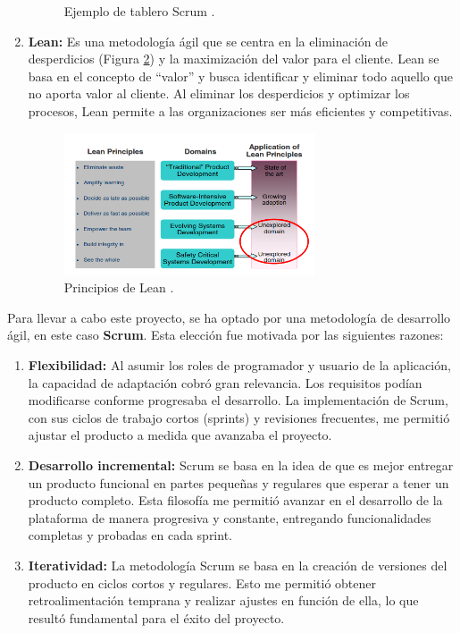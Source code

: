 \begin{enumerate}
\begin{figure}[H]
        \caption{Ejemplo de tablero Scrum \cite{karabiyik2020understanding}.}
        \label{fig:scrum}
    \end{figure}
    \item \textbf{Lean:} Es una metodología ágil que se centra en la eliminación de desperdicios (Figura \ref{fig:lean}) y la maximización del valor para el cliente. Lean se basa en el concepto de ``valor'' y busca identificar y eliminar todo aquello que no aporta valor al cliente. Al eliminar los desperdicios y optimizar los procesos, Lean permite a las organizaciones ser más eficientes y competitivas.
    \begin{figure}[H]
        \centering
        \includegraphics[width=0.7\textwidth]{imagenes/lean.png}
        \caption{Principios de Lean \cite{cawley2010lean}.}
        \label{fig:lean}
    \end{figure}
\end{enumerate}

Para llevar a cabo este proyecto, se ha optado por una metodología de desarrollo ágil, en este caso \textbf{Scrum}. Esta elección fue motivada por las siguientes razones:

\begin{enumerate}
    \item \textbf{Flexibilidad:} Al asumir los roles de programador y usuario de la aplicación, la capacidad de adaptación cobró gran relevancia. Los requisitos podían modificarse conforme progresaba el desarrollo. La implementación de Scrum, con sus ciclos de trabajo cortos (sprints) y revisiones frecuentes, me permitió ajustar el producto a medida que avanzaba el proyecto.
    \item \textbf{Desarrollo incremental:} Scrum se basa en la idea de que es mejor entregar un producto funcional en partes pequeñas y regulares que esperar a tener un producto completo. Esta filosofía me permitió avanzar en el desarrollo de la plataforma de manera progresiva y constante, entregando funcionalidades completas y probadas en cada sprint.
    \item \textbf{Iteratividad:} La metodología Scrum se basa en la creación de versiones del producto en ciclos cortos y regulares. Esto me permitió obtener retroalimentación temprana y realizar ajustes en función de ella, lo que resultó fundamental para el éxito del proyecto.
\end{enumerate}

